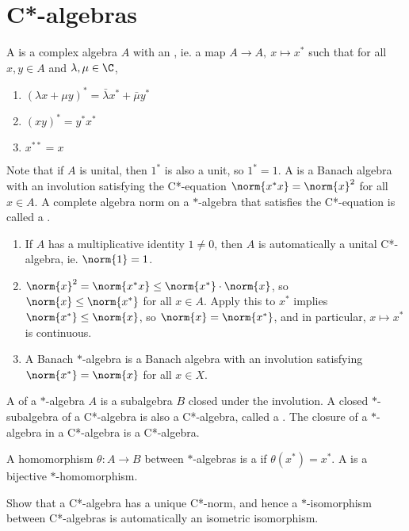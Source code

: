 \documentclass[a4paper]{article}
\begin{document}
\newpage

\section{C*-algebras}
A  is a complex algebra $A$ with an , ie. a map $A\to A,\ x\mapsto x^*$ such that for all $x,y\in A$ and $\lambda,\mu\in\C$,
\begin{enumerate}[label=(\roman*)]
	\item $(\lambda x+\mu y)^*=\bar{\lambda}x^*+\bar{\mu}y^*$
	\item $(xy)^*=y^*x^*$
	\item $x^{**}=x$
\end{enumerate}
Note that if $A$ is unital, then $1^*$ is also a unit, so $1^*=1$. A  is a Banach algebra with an involution satisfying the C*-equation $\norm{x^*x}=\norm{x}^2$ for all $x\in A$. A complete algebra norm on a $*$-algebra that satisfies the C*-equation is called a .

\begin{remark}
	\begin{enumerate}[label=(\arabic*)]
		\item If $A$ has a multiplicative identity $1\not= 0$, then $A$ is automatically a unital C*-algebra, ie. $\norm{1}=1$.
		\item $\norm{x}^2=\norm{x^*x}\leq\norm{x^*}\cdot\norm{x}$, so $\norm{x}\leq\norm{x^*}$ for all $x\in A$. Apply this to $x^*$ implies $\norm{x^*}\leq\norm{x}$, so $\norm{x}=\norm{x^*}$, and in particular, $x\mapsto x^*$ is continuous.
		\item A Banach $*$-algebra is a Banach algebra with an involution satisfying $\norm{x^*}=\norm{x}$ for all $x\in X$.
	\end{enumerate}
\end{remark}

A  of a $*$-algebra $A$ is a subalgebra $B$ closed under the involution. A closed $*$-subalgebra of a C*-algebra is also a C*-algebra, called a . The closure of a $*$-algebra in a C*-algebra is a C*-algebra.

A homomorphism $\theta:A\to B$ between $*$-algebras is a  if $\theta(x^*)=x^*$. A  is a bijective $*$-homomorphism.

\begin{ex}
  Show that a C*-algebra has a unique C*-norm, and hence a $*$-isomorphism between C*-algebras is automatically an isometric isomorphism.
\end{ex}
\end{document}

